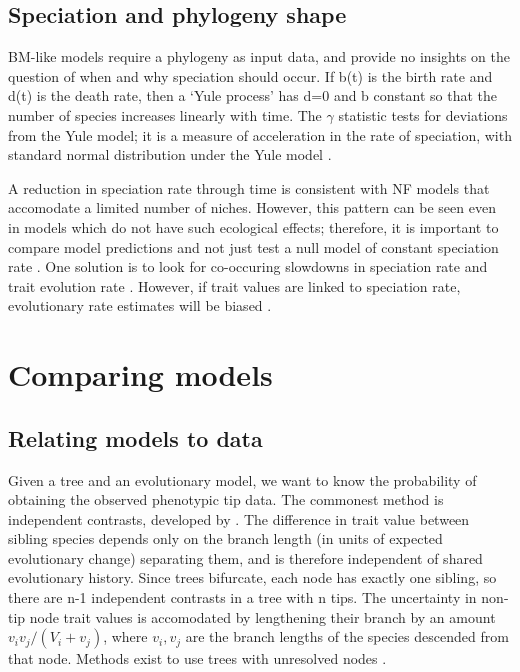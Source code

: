 \documentclass[12pt]{article}
\begin{document}
\subsection{Speciation and phylogeny shape}

BM-like models require a phylogeny as input data, and provide no insights on the question of when and why speciation should occur.
If b(t) is the birth rate and d(t) is the death rate, then a `Yule process' has d=0 and b constant so that the number of species increases linearly with time. 
The $\gamma$ statistic tests for deviations from the Yule model; it is a measure of acceleration in the rate of speciation, with standard normal distribution under the Yule model \citep{pybus_testing_2000}. 

A reduction in speciation rate through time is consistent with NF models that accomodate a limited number of niches. 
However, this pattern can be seen even in models which do not have such ecological effects; therefore, it is important to compare model predictions and not just test a null model of constant speciation rate \citep{rabosky_heritability_2009}. 
One solution is to look for co-occuring slowdowns in speciation rate and trait evolution rate \citep{harmon_early_2010}. 
However, if trait values are linked to speciation rate, evolutionary rate estimates will be biased \citep{pennell_integrative_2013}. 

\section{Comparing models}

\subsection{Relating models to data}

Given a tree and an evolutionary model, we want to know the probability of obtaining the observed phenotypic tip data. 
The commonest method is independent contrasts, developed by \citet{felsenstein_maximum-likelihood_1973,felsenstein_phylogenies_1985}. 
The difference in trait value between sibling species depends only on the branch length (in units of expected evolutionary change) separating them, and is therefore independent of shared evolutionary history. 
Since trees bifurcate, each node has exactly one sibling, so there are n-1 independent contrasts in a tree with n tips. 
The uncertainty in non-tip node trait values is accomodated by lengthening their branch by an amount $v_i v_j / (V_i + v_j)$, where $v_i, v_j$ are the branch lengths of the species descended from that node. 
Methods exist to use trees with unresolved nodes \citep{pagel_seeking_1993}.
\end{document}
